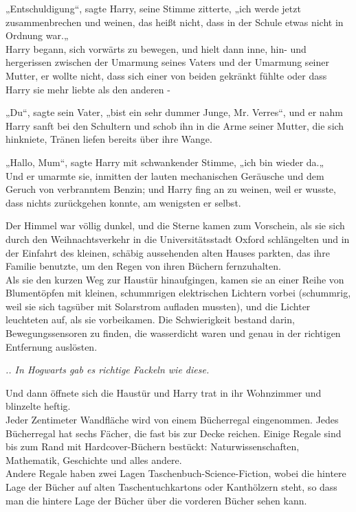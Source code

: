 {„Entschuldigung“, sagte Harry, seine Stimme zitterte, „ich werde jetzt zusammenbrechen und weinen, das heißt nicht, dass in der Schule etwas nicht in Ordnung war.„\\ Harry begann, sich vorwärts zu bewegen, und hielt dann inne, hin- und hergerissen zwischen der Umarmung seines Vaters und der Umarmung seiner Mutter, er wollte nicht, dass sich einer von beiden gekränkt fühlte oder dass Harry sie mehr liebte als den anderen -

„Du“, sagte sein Vater, „bist ein sehr dummer Junge, Mr. Verres“, und er nahm Harry sanft bei den Schultern und schob ihn in die Arme seiner Mutter, die sich hinkniete, Tränen liefen bereits über ihre Wange.

„Hallo, Mum“, sagte Harry mit schwankender Stimme, „ich bin wieder da.„\\ Und er umarmte sie, inmitten der lauten mechanischen Geräusche und dem Geruch von verbranntem Benzin; und Harry fing an zu weinen, weil er wusste, dass nichts zurückgehen konnte, am wenigsten er selbst.

Der Himmel war völlig dunkel, und die Sterne kamen zum Vorschein, als sie sich durch den Weihnachtsverkehr in die Universitätsstadt Oxford schlängelten und in der Einfahrt des kleinen, schäbig aussehenden alten Hauses parkten, das ihre Familie benutzte, um den Regen von ihren Büchern fernzuhalten.\\ Als sie den kurzen Weg zur Haustür hinaufgingen, kamen sie an einer Reihe von Blumentöpfen mit kleinen, schummrigen elektrischen Lichtern vorbei (schummrig, weil sie sich tagsüber mit Solarstrom aufladen mussten), und die Lichter leuchteten auf, als sie vorbeikamen. Die Schwierigkeit bestand darin, Bewegungssensoren zu finden, die wasserdicht waren und genau in der richtigen Entfernung auslösten.

\emph{.. In Hogwarts gab es richtige Fackeln wie diese.}

Und dann öffnete sich die Haustür und Harry trat in ihr Wohnzimmer und blinzelte heftig.\\ Jeder Zentimeter Wandfläche wird von einem Bücherregal eingenommen. Jedes Bücherregal hat sechs Fächer, die fast bis zur Decke reichen. Einige Regale sind bis zum Rand mit Hardcover-Büchern bestückt: Naturwissenschaften, Mathematik, Geschichte und alles andere.\\ Andere Regale haben zwei Lagen Taschenbuch-Science-Fiction, wobei die hintere Lage der Bücher auf alten Taschentuchkartons oder Kanthölzern steht, so dass man die hintere Lage der Bücher über die vorderen Bücher sehen kann.

}
